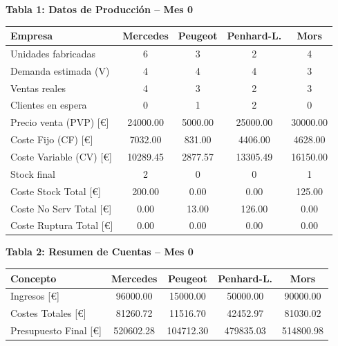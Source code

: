 \documentclass{standalone}
\begin{document}
	\leavevmode %
	
	\begin{minipage}{1.08\linewidth}
		\centering
		
		\textbf{Tabla 1: Datos de Producción – Mes 0}\\[0.5em]
		\begin{tabular}{@{}l
				S[table-format=2.0]
				S[table-format=2.0]
				S[table-format=2.0]
				S[table-format=2.0]@{}}
			\toprule
			\textbf{Empresa} & \textbf{Mercedes} & \textbf{Peugeot} & \textbf{Penhard-L.} & \textbf{Mors} \\
			\midrule
			Unidades fabricadas & 6 & 3 & 2 & 4 \\
			Demanda estimada (V) & 4 & 4 & 4 & 3 \\
			Ventas reales & 4 & 3 & 2 & 3 \\
			Clientes en espera & 0 & 1 & 2 & 0 \\
			Precio venta (PVP) [\euro] & 24000.00 & 5000.00 & 25000.00 & 30000.00 \\
			Coste Fijo (CF) [\euro] & 7032.00 & 831.00 & 4406.00 & 4628.00 \\
			Coste Variable (CV) [\euro] & 10289.45 & 2877.57 & 13305.49 & 16150.00 \\
			Stock final & 2 & 0 & 0 & 1 \\
			Coste Stock Total [\euro] & 200.00 & 0.00 & 0.00 & 125.00 \\
			Coste No Serv Total [\euro] & 0.00 & 13.00 & 126.00 & 0.00 \\
			Coste Ruptura Total [\euro] & 0.00 & 0.00 & 0.00 & 0.00 \\
			\bottomrule
		\end{tabular}
		
		\vspace{2em} %
		
		\textbf{Tabla 2: Resumen de Cuentas – Mes 0}\\[0.5em]
		\begin{tabular}{@{}l
				S[table-format=7.2]
				S[table-format=7.2]
				S[table-format=7.2]
				S[table-format=7.2]@{}}
			\toprule
			\textbf{Concepto} & \textbf{Mercedes} & \textbf{Peugeot} & \textbf{Penhard-L.} & \textbf{Mors} \\
			\midrule
			Ingresos [\euro] & 96000.00 & 15000.00 & 50000.00 & 90000.00 \\
			Costes Totales [\euro] & 81260.72 & 11516.70 & 42452.97 & 81030.02 \\
			Presupuesto Final [\euro] & 520602.28 & 104712.30 & 479835.03 & 514800.98 \\
			\bottomrule
		\end{tabular}
		
	\end{minipage}
	
\end{document}
